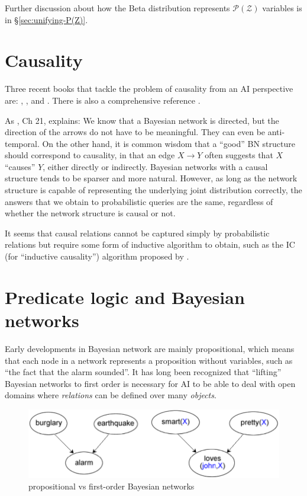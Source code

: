 Further discussion about how the Beta distribution represents $\mathcal{P(Z)}$ variables is in \S\ref{sec:unifying-P(Z)}.

\section{Causality}

Three recent books that tackle the problem of causality from an AI perspective are: \citep*{Shafer1996}, \citep*{Pearl2000}, and \citep*{Williamson2005}.  There is also a comprehensive reference \citep*{Beebee2009}.

As \citep*{Koller2009}, Ch 21, explains:  We know that a Bayesian network is directed, but the direction of the arrows do not have to be meaningful.  They can even be anti-temporal.  On the other hand, it is common wisdom that a ``good'' BN structure should correspond to causality, in that an edge $X \rightarrow Y$ often suggests that $X$ ``causes'' $Y$, either directly or indirectly.  Bayesian networks with a causal structure tends to be sparser and more natural.  However, as long as the network structure is capable of representing the underlying joint distribution correctly, the answers that we obtain to probabilistic queries are the same, regardless of whether the network structure is causal or not.


It seems that causal relations cannot be captured simply by probabilistic relations but require some form of inductive algorithm to obtain, such as the IC (for ``inductive causality'') algorithm proposed by \citep*{Pearl2000}.

\underconst

\section{Predicate logic and Bayesian networks}
\label{sec:FOL-BN}

Early developments in Bayesian network are mainly propositional, which means that each node in a network represents a proposition without variables, such as ``the fact that the alarm sounded''.  It has long been recognized that ``lifting'' Bayesian networks to first order is necessary for AI to be able to deal with open domains where \emph{relations} can be defined over many \emph{objects}.

\begin{figure}[H]
\centering
\includegraphics[scale=0.75]{FirstOrderBayesNet.png}
\caption{propositional vs first-order Bayesian networks}
\end{figure}

